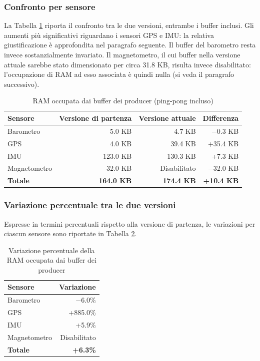 \subsubsection{Confronto per sensore}
La Tabella \ref{tab:ram-buffer-sensori} riporta il confronto tra le due
versioni, entrambe i buffer inclusi. Gli aumenti più
significativi riguardano i sensori GPS e IMU: la relativa giustificazione è
approfondita nel paragrafo seguente. Il buffer del barometro resta invece
sostanzialmente invariato. Il magnetometro, il cui buffer nella versione
attuale sarebbe stato dimensionato per circa 31.8 KB, risulta invece
disabilitato: l'occupazione di RAM ad esso associata è quindi nulla (si veda
il paragrafo successivo).

\begin{table}[H]
    \centering
    \begin{tabular}{l r r r}
        \hline
        \textbf{Sensore} & \textbf{Versione di partenza} & \textbf{Versione attuale} & \textbf{Differenza} \\
        \hline
        Barometro & 5.0 KB & 4.7 KB & $-$0.3 KB \\
        GPS & 4.0 KB & 39.4 KB & +35.4 KB \\
        IMU & 123.0 KB & 130.3 KB & +7.3 KB \\
        Magnetometro & 32.0 KB & Disabilitato & $-$32.0 KB \\
        \hline
        \textbf{Totale} & \textbf{164.0 KB} & \textbf{174.4 KB} & \textbf{+10.4 KB} \\
        \hline
    \end{tabular}
    \caption{RAM occupata dai buffer dei producer (ping-pong incluso)}
    \label{tab:ram-buffer-sensori}
\end{table}

\subsubsection{Variazione percentuale tra le due versioni}
Espresse in termini percentuali rispetto alla versione di partenza, le
variazioni per ciascun sensore sono riportate in
Tabella \ref{tab:ram-buffer-variazione-percentuale}.

\begin{table}[H]
    \centering
    \begin{tabular}{l r}
        \hline
        \textbf{Sensore} & \textbf{Variazione} \\
        \hline
        Barometro & $-$6.0\% \\
        GPS & +885.0\% \\
        IMU & +5.9\% \\
        Magnetometro & Disabilitato \\
        \hline
        \textbf{Totale} & \textbf{+6.3\%} \\
        \hline
    \end{tabular}
    \caption{Variazione percentuale della RAM occupata dai buffer dei producer}
    \label{tab:ram-buffer-variazione-percentuale}
\end{table}

